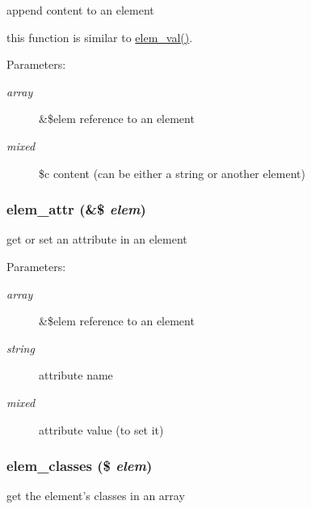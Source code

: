 append content to an element

this function is similar to \hyperlink{html_8inc_8php_e28d850c3c906c6884462ca89c06f59b}{elem\_\-val()}. \begin{Desc}
\item[Parameters:]
\begin{description}
\item[{\em array}]\&\$elem reference to an element \item[{\em mixed}]\$c content (can be either a string or another element) \end{description}
\end{Desc}
\hypertarget{html_8inc_8php_894dc22f3b7668c59364599909162b8e}{
\subsubsection[{elem\_\-attr}]{\setlength{\rightskip}{0pt plus 5cm}elem\_\-attr (\&\$ {\em elem})}}
\label{html_8inc_8php_894dc22f3b7668c59364599909162b8e}


get or set an attribute in an element

\begin{Desc}
\item[Parameters:]
\begin{description}
\item[{\em array}]\&\$elem reference to an element \item[{\em string}]attribute name \item[{\em mixed}]attribute value (to set it) \end{description}
\end{Desc}
\hypertarget{html_8inc_8php_821651b8923938645b0b0fa6bb084522}{
\subsubsection[{elem\_\-classes}]{\setlength{\rightskip}{0pt plus 5cm}elem\_\-classes (\$ {\em elem})}}
\label{html_8inc_8php_821651b8923938645b0b0fa6bb084522}


get the element's classes in an array


